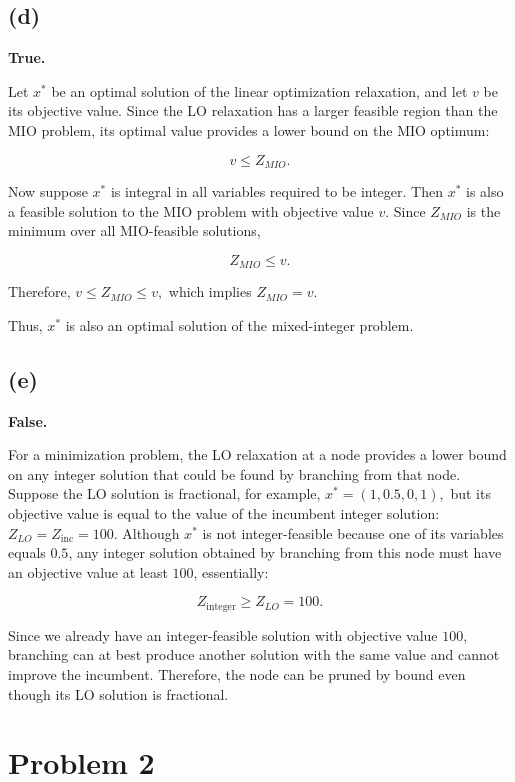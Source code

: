 \documentclass{article}
\begin{document}
\vspace{5mm}
\subsection*{(d)}

\textbf{True.}

Let $x^*$ be an optimal solution of the linear optimization relaxation, and let $v$ be its objective value. Since the LO relaxation has a larger feasible region than the MIO problem, its optimal value provides a lower bound on the MIO optimum:

$$
v \leq Z_{MIO}.
$$

Now suppose $x^*$ is integral in all variables required to be integer. Then $x^*$ is also a feasible solution to the MIO problem with objective value $v$. Since $Z_{MIO}$ is the minimum over all MIO-feasible solutions,

$$
Z_{MIO} \leq v.
$$

Therefore, $
v \leq Z_{MIO} \leq v,
$ which implies $
Z_{MIO}=v.
$

Thus, $x^*$ is also an optimal solution of the mixed-integer problem.


\newpage
\subsection*{(e)}

\textbf{False.}

For a minimization problem, the LO relaxation at a node provides a lower bound on any integer solution that could be found by branching from that node. Suppose the LO solution is fractional, for example, $
x^* = (1, 0.5, 0, 1),
$ but its objective value is equal to the value of the incumbent integer solution: $
Z_{LO} = Z_{\text{inc}} = 100.
$ Although $x^*$ is not integer-feasible because one of its variables equals $0.5$, any integer solution obtained by branching from this node must have an objective value at least $100$, essentially: 

$$
Z_{\text{integer}} \geq Z_{LO} = 100.
$$

Since we already have an integer-feasible solution with objective value $100$, branching can at best produce another solution with the same value and cannot improve the incumbent. Therefore, the node can be pruned by bound even though its LO solution is fractional.

\vspace{7mm}

\section*{Problem 2}
\end{document}
